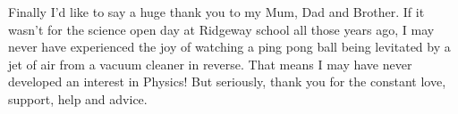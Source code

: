 Finally I'd like to say a huge thank you to my Mum, Dad and Brother. If it wasn't for the science open day at Ridgeway school all those years ago, I may never have experienced the joy of watching a ping pong ball being levitated by a jet of air from a vacuum cleaner in reverse. That means I may have never developed an interest in Physics! But seriously, thank you for the constant love, support, help and advice.